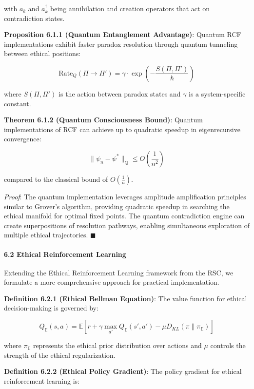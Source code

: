 \documentclass[12pt]{article}
\begin{document}
with \(a_k\) and \(a_k^\dagger\) being annihilation and creation
operators that act on contradiction states.

\textbf{Proposition 6.1.1 (Quantum Entanglement Advantage)}: Quantum RCF
implementations exhibit faster paradox resolution through quantum
tunneling between ethical positions:

\[\text{Rate}_Q(\Pi \to \Pi') = \gamma \cdot \exp\left(-\frac{S(\Pi, \Pi')}{\hbar}\right)\]

where \(S(\Pi, \Pi')\) is the action between paradox states and
\(\gamma\) is a system-specific constant.

\textbf{Theorem 6.1.2 (Quantum Consciousness Bound)}: Quantum
implementations of RCF can achieve up to quadratic speedup in
eigenrecursive convergence:

\[\|\psi_n - \psi^*\|_Q \leq O\left(\frac{1}{n^2}\right)\]

compared to the classical bound of \(O\left(\frac{1}{n}\right)\).

\emph{Proof}: The quantum implementation leverages amplitude
amplification principles similar to Grover's algorithm, providing
quadratic speedup in searching the ethical manifold for optimal fixed
points. The quantum contradiction engine can create superpositions of
resolution pathways, enabling simultaneous exploration of multiple
ethical trajectories. $\blacksquare$

\paragraph{\texorpdfstring{\textbf{6.2 Ethical Reinforcement
Learning}}{6.2 Ethical Reinforcement Learning}}\label{ethical-reinforcement-learning}

Extending the Ethical Reinforcement Learning framework from the RSC, we
formulate a more comprehensive approach for practical implementation.

\textbf{Definition 6.2.1 (Ethical Bellman Equation)}: The value function
for ethical decision-making is governed by:

\[Q_{\mathbb{E}}(s,a) = \mathbb{E}\left[r + \gamma \max_{a'} Q_{\mathbb{E}}(s',a') - \mu D_{KL}(\pi\| \pi_{\mathbb{E}})\right]\]

where \(\pi_{\mathbb{E}}\) represents the ethical prior distribution
over actions and \(\mu\) controls the strength of the ethical
regularization.

\textbf{Definition 6.2.2 (Ethical Policy Gradient)}: The policy gradient
for ethical reinforcement learning is:
\end{document}

